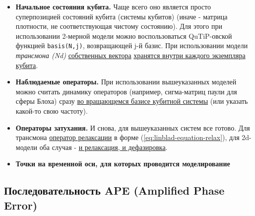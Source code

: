 \documentclass[12pt, twoside]{report}
\numberwithin{equation}{section}
\numberwithin{figure}{section}
\begin{document}
\begin{itemize}
\begin{itemize}
	\end{itemize}
	\item \textbf{Начальное состояния кубита.} Чаще всего оно является просто суперпозицией состояний кубита (системы кубитов) (иначе - матрица плотности, не соответствующая чистому состоянию). Для этого при использовании 2-мерной модели можно воспользоваться QuTiP-овской функцией \texttt{basis(N,j)}, возвращающей j-й базис. При использовании модели \textit{трансмона (Nd)} \underline{собственных вектора} \underline{хранятся внутри каждого экземпляра кубита}.
	\item \textbf{Наблюдаемые операторы.} При использовании вышеуказанных моделей можно считать динамику операторов (например, сигма-матриц паули для сферы Блоха) сразу \underline{во вращающемся базисе кубитной системы} (или указать какой-то свою частоту).
	\item \textbf{Операторы затухания.} И снова, для вышеуказанных систем все готово. Для трансмона \underline{оператор релаксации} в форме (\ref{eq:linblad-equation-relax}), для 2d-модели оба случая - \underline{и релаксация, и дефазировка}.
	\item \textbf{Точки на временной оси, для которых проводится моделирование}
\end{itemize} 

\subsection{Последовательность APE (Amplified Phase Error)} \label{subsec:APE}
\end{document}
